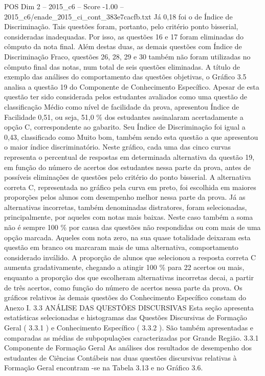 \begin{textsample}{POS Dim 2 – 2015\_c6 – Score -1.00 – 2015\_c6/enade\_2015\_ci\_cont\_383e7cacfb.txt}
Já 0,18 foi o de Índice de Discriminação.
Tais questões foram, portanto, pelo critério ponto bisserial, consideradas inadequadas.
Por isso, as questões 16 e 17 foram eliminadas do cômputo da nota final.
Além destas duas, as demais questões com Índice de Discriminação Fraco, questões 26, 28, 29 e 30 também não foram utilizadas no cômputo final das notas, num total de seis questões eliminadas.
A título de exemplo das análises do comportamento das questões objetivas, o Gráfico 3.5 analisa a questão 19 do Componente de Conhecimento Específico.
Apesar de esta questão ter sido considerada pelos estudantes avaliados como uma questão de classificação Médio como nível de facilidade da prova, apresentou Índice de Facilidade 0,51, ou seja, 51,0 \% dos estudantes assinalaram acertadamente a opção C, correspondente ao gabarito.
Seu Índice de Discriminação foi igual a 0,43, classificado como Muito bom, também sendo esta questão a que apresentou o maior índice discriminatório.
Neste gráfico, cada uma das cinco curvas representa o percentual de respostas em determinada alternativa da questão 19, em função do número de acertos dos estudantes nessa parte da prova, antes de possíveis eliminações de questões pelo critério do ponto bisserial.
A alternativa correta C, representada no gráfico pela curva em preto, foi escolhida em maiores proporções pelos alunos com desempenho melhor nessa parte da prova.
Já as alternativas incorretas, também denominadas distratores, foram selecionadas, principalmente, por aqueles com notas mais baixas.
Neste caso também a soma não é sempre 100 \% por causa das questões não respondidas ou com mais de uma opção marcada.
Aqueles com nota zero, na sua quase totalidade deixaram esta questão em branco ou marcaram mais de uma alternativa, comportamento considerado inválido.
A proporção de alunos que selecionou a resposta correta C aumenta gradativamente, chegando a atingir 100 \% para 22 acertos ou mais, enquanto a proporção dos que escolheram alternativas incorretas decai, a partir de três acertos, como função do número de acertos nessa parte da prova.
Os gráficos relativos às demais questões do Conhecimento Específico constam do Anexo I. 3.3 ANÁLISE DAS QUESTÕES DISCURSIVAS Esta seção apresenta estatísticas selecionadas e histogramas das Questões Discursivas de Formação Geral ( 3.3.1 ) e Conhecimento Específico ( 3.3.2 ).
São também apresentadas e comparadas as médias de subpopulações caracterizadas por Grande Região. 3.3.1 Componente de Formação Geral As análises dos resultados de desempenho dos estudantes de Ciências Contábeis nas duas questões discursivas relativas à Formação Geral encontram -se na Tabela 3.13 e no Gráfico 3.6.

\end{textsample}
